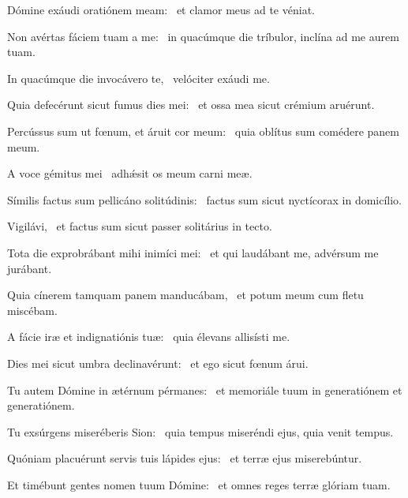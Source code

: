 \item Dómine exáudi oratiónem meam:~\psstar{} et clamor meus ad te véniat.

\item Non avértas fáciem tuam a me:~\psstar{} in quacúmque die tríbulor, inclína ad me aurem tuam.

\item In quacúmque die invocávero te,~\psstar{} velóciter exáudi me.

\item Quia defecérunt sicut fumus dies mei:~\psstar{} et ossa mea sicut crémium aruérunt.

\item Percússus sum ut fœnum, et áruit cor meum:~\psstar{} quia oblítus sum comédere panem meum.

\item A voce gémitus mei~\psstar{} adhǽsit os meum carni meæ.

\item Símilis factus sum pellicáno solitúdinis:~\psstar{} factus sum sicut nyctícorax in domicílio.

\item Vigilávi,~\psstar{} et factus sum sicut passer solitárius in tecto.

\item Tota die exprobrábant mihi inimíci mei:~\psstar{} et qui laudábant me, advérsum me jurábant.

\item Quia cínerem tamquam panem manducábam,~\psstar{} et potum meum cum fletu miscébam.

\item A fácie iræ et indignatiónis tuæ:~\psstar{} quia élevans allisísti me.

\item Dies mei sicut umbra declinavérunt:~\psstar{} et ego sicut fœnum árui.

\item Tu autem Dómine in ætérnum pérmanes:~\psstar{} et memoriále tuum in generatiónem et generatiónem.

\item Tu exsúrgens miseréberis Sion:~\psstar{} quia tempus miseréndi ejus, quia venit tempus.

\item Quóniam placuérunt servis tuis lápides ejus:~\psstar{} et terræ ejus miserebúntur.

\item Et timébunt gentes nomen tuum Dómine:~\psstar{} et omnes reges terræ glóriam tuam.

